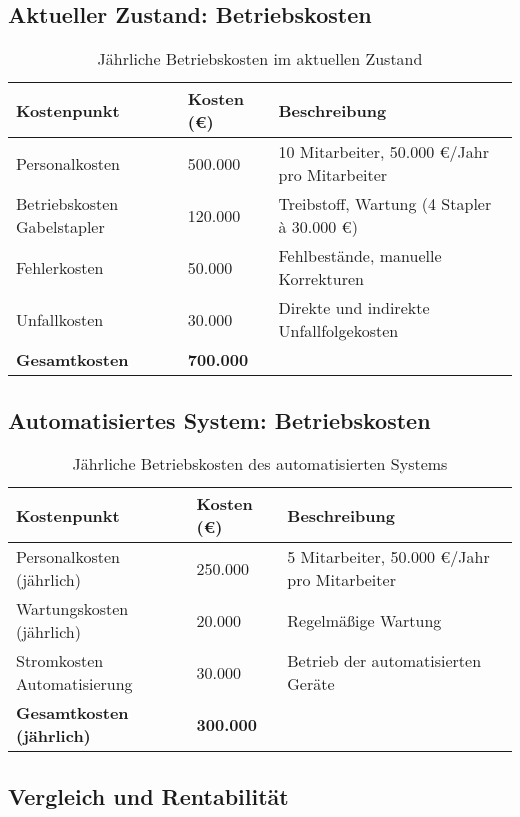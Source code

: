 \subsection*{Aktueller Zustand: Betriebskosten}

\begin{table}[h!]
	\centering
	\begin{tabular}{|p{8cm}|p{4cm}|p{5cm}|}
		\hline
		\textbf{Kostenpunkt} & \textbf{Kosten (€)} & \textbf{Beschreibung} \\
		\hline
		Personalkosten  & 500.000 & 10 Mitarbeiter, 50.000 €/Jahr pro Mitarbeiter \\
		\hline
		Betriebskosten Gabelstapler & 120.000 & Treibstoff, Wartung (4 Stapler à 30.000 €) \\
		\hline
		Fehlerkosten & 50.000 & Fehlbestände, manuelle Korrekturen \\
		\hline
		Unfallkosten & 30.000 & Direkte und indirekte Unfallfolgekosten \\
		\hline
		\textbf{Gesamtkosten} & \textbf{700.000} & \\
		\hline
	\end{tabular}
	\caption{Jährliche Betriebskosten im aktuellen Zustand}
\end{table}

\subsection*{Automatisiertes System: Betriebskosten}

\begin{table}[h!]
	\centering
	\begin{tabular}{|p{8cm}|p{4cm}|p{5cm}|}
		\hline
		\textbf{Kostenpunkt} & \textbf{Kosten (€)} & \textbf{Beschreibung} \\
		\hline
		Personalkosten (jährlich) & 250.000 & 5 Mitarbeiter, 50.000 €/Jahr pro Mitarbeiter \\
		\hline
		Wartungskosten (jährlich) & 20.000 & Regelmäßige Wartung \\
		\hline
		Stromkosten Automatisierung & 30.000 & Betrieb der automatisierten Geräte \\
		\hline
		\textbf{Gesamtkosten (jährlich)} & \textbf{300.000} & \\
		\hline
	\end{tabular}
	\caption{Jährliche Betriebskosten des automatisierten Systems}
\end{table}

\subsection*{Vergleich und Rentabilität}


